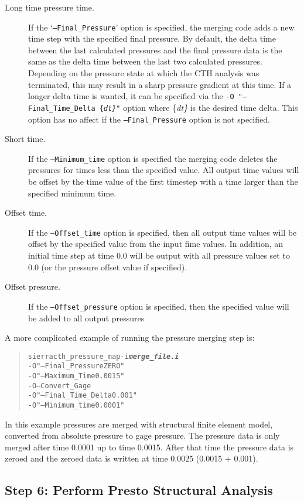 \documentclass[11pt,twoside]{article}
\newcommand{\cmd}[1]
   {\mbox{\tt #1}\null}
\newcommand{\file}[1]
   {\mbox{\bf\em #1}\null}
\newcommand{\param}[1]
   {\mbox{\{\em #1\}}\null}
\newenvironment{source}
{\small\begin{quote}\begin{alltt}}
{\end{alltt}\end{quote}\normalsize}
\begin{document}
\begin{description}
\item [Long time pressure time.]  If the `\cmd{{--}Final\_Pressure}' option
is specified, the merging code adds a new time step with the specified
final pressure. By default, the delta time between the last calculated
pressures and the final pressure data is the same as the delta time
between the last two calculated pressures. Depending on the pressure
state at which the CTH analysis was terminated, this may result in a
sharp pressure gradient at this time.  If a longer delta time is
wanted, it can be specified via the \cmd{{}-O
"{--}Final\_Time\_Delta \param{dt}"} option where
\param{dt} is the desired time delta. This
option has no affect if the \cmd{{--}Final\_Pressure} option is
not specified.
\item [Short time.]  If the \cmd{{}--Minimum\_time} option is specified the
merging code deletes the pressures for times less than the specified
value. All output time values will be offset by the time value of the
first timestep with a time larger than the specified minimum time.
\item [Offset time.] If the \cmd{{}--Offset\_time} option is specified,
then all output time values will be offset by the specified value from
the input fime values.  In addition, an initial time step at time 0.0
will be output with all pressure values set to 0.0 (or the pressure
offset value if specified).

\item [Offset pressure.] If the \cmd{{}--Offset\_pressure} option is
specified, then the specified value will be added to all output pressures
\end{description}

A more complicated example of running the pressure merging step is:

\begin{source}
sierra cth_pressure_map -i \file{merge\_file.i}
   {-}O "{--}Final\_Pressure ZERO"
   {-}O "{--}Maximum\_Time 0.0015"
   {-}O {--}Convert\_Gage
   {-}O "{--}Final\_Time\_Delta 0.001"
   {-}O "{--}Minimum\_time 0.0001"
\end{source}

In this example pressures are merged with structural finite element
model, converted from absolute pressure to gage pressure.  The
pressure data is only merged after time 0.0001 up to time 0.0015.
 After that time the pressure data is zeroed and the zeroed data is
written at time 0.0025 (0.0015 + 0.001).

\subsection{Step 6: Perform Presto Structural Analysis}\label{sec:step6}
\end{document}
